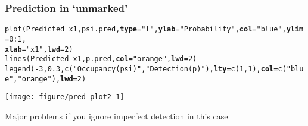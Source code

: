 \documentclass[color=usenames,dvipsnames]{beamer}\usepackage[]{graphicx}\usepackage[]{xcolor}
\makeatletter
\newcommand{\hlnum}[1]{\textcolor[rgb]{0.69,0.494,0}{#1}}%
\newcommand{\hlstr}[1]{\textcolor[rgb]{0.749,0.012,0.012}{#1}}%
\newcommand{\hlopt}[1]{\textcolor[rgb]{0,0,0}{#1}}%
\newcommand{\hlstd}[1]{\textcolor[rgb]{0,0,0}{#1}}%
\newcommand{\hlkwc}[1]{\textcolor[rgb]{0,0,0}{\textbf{#1}}}%
\newcommand{\hlkwd}[1]{\textcolor[rgb]{0.004,0.004,0.506}{#1}}%
\newenvironment{kframe}{%
 \def\at@end@of@kframe{}%
 \ifinner\ifhmode%
  \def\at@end@of@kframe{\end{minipage}}%
  \begin{minipage}{\columnwidth}%
 \fi\fi%
 \def\FrameCommand##1{\hskip\@totalleftmargin \hskip-\fboxsep
 \colorbox{shadecolor}{##1}\hskip-\fboxsep
     \hskip-\linewidth \hskip-\@totalleftmargin \hskip\columnwidth}%
 \MakeFramed {\advance\hsize-\width
   \@totalleftmargin\z@ \linewidth\hsize
   \@setminipage}}%
 {\par\unskip\endMakeFramed%
 \at@end@of@kframe}
\newenvironment{knitrout}{}{} %
\makeatother
\begin{document}




\begin{frame}[fragile]
  \frametitle{Prediction in `unmarked'}
\begin{knitrout}\tiny
{}\color{fgcolor}\begin{kframe}
\begin{alltt}
\hlkwd{plot}\hlstd{(Predicted} \hlopt{~} \hlstd{x1, psi.pred,} \hlkwc{type}\hlstd{=}\hlstr{"l"}\hlstd{,} \hlkwc{ylab}\hlstd{=}\hlstr{"Probability"}\hlstd{,} \hlkwc{col}\hlstd{=}\hlstr{"blue"}\hlstd{,} \hlkwc{ylim}\hlstd{=}\hlnum{0}\hlopt{:}\hlnum{1}\hlstd{,}
     \hlkwc{xlab}\hlstd{=}\hlstr{"x1"}\hlstd{,} \hlkwc{lwd}\hlstd{=}\hlnum{2}\hlstd{)}
\hlkwd{lines}\hlstd{(Predicted} \hlopt{~} \hlstd{x1, p.pred,} \hlkwc{col}\hlstd{=}\hlstr{"orange"}\hlstd{,} \hlkwc{lwd}\hlstd{=}\hlnum{2}\hlstd{)}
\hlkwd{legend}\hlstd{(}\hlopt{-}\hlnum{3}\hlstd{,} \hlnum{0.3}\hlstd{,} \hlkwd{c}\hlstd{(}\hlstr{"Occupancy (psi)"}\hlstd{,} \hlstr{"Detection (p)"}\hlstd{),} \hlkwc{lty}\hlstd{=}\hlkwd{c}\hlstd{(}\hlnum{1}\hlstd{,} \hlnum{1}\hlstd{),} \hlkwc{col}\hlstd{=}\hlkwd{c}\hlstd{(}\hlstr{"blue"}\hlstd{,} \hlstr{"orange"}\hlstd{),} \hlkwc{lwd}\hlstd{=}\hlnum{2}\hlstd{)}
\end{alltt}
\end{kframe}

{\centering \texttt{[image: figure/pred-plot2-1]} 

}


\end{knitrout}
\small
\centering
Major problems if you ignore imperfect detection in this case \\
\end{frame}
\end{document}
